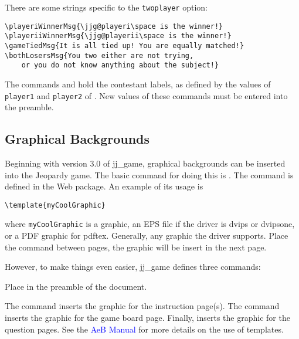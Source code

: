 \documentclass{article}
\def\jj{\textsf{jj\_game}}
\begin{document}
There are some strings specific to the \texttt{twoplayer} option:

\begin{Verbatim}[xleftmargin=\amtIndent,fontsize=\small]
\playeriWinnerMsg{\jjg@playeri\space is the winner!}
\playeriiWinnerMsg{\jjg@playerii\space is the winner!}
\gameTiedMsg{It is all tied up! You are equally matched!}
\bothLosersMsg{You two either are not trying,
    or you do not know anything about the subject!}
\end{Verbatim}
The commands  and  hold the contestant labels,
as defined by the values of \texttt{player1} and \texttt{player2} of .
New values of these commands must be entered into the preamble.


\subsection{Graphical Backgrounds}\label{graphicsBGs}

Beginning with version 3.0 of \jj, graphical backgrounds can be inserted into
the Jeopardy game. The basic command for doing this is .
The  command is defined in the Web package.  An example
of its usage is
\begin{Verbatim}
\template{myCoolGraphic}
\end{Verbatim}
where \texttt{myCoolGraphic} is a graphic, an EPS file if the driver
is dvips or dvipsone, or a PDF graphic for pdftex. Generally, any
graphic the driver supports.  Place the  command
between pages, the graphic will be insert in the next page.

However, to make things even easier, {\jj} defines three commands:
\bVerb{}%
\begin{dCmd}[commandchars=!()]{\bxSize}
\end{dCmd}
\endgroup
\CmdLoc Place in the preamble of the document.

\CmdDescription The  command inserts the
graphic for the instruction page(s). The  command
inserts the graphic for the game board page.
Finally,  inserts the graphic for the question
pages. See the \textcolor{blue}{AeB Manual} for more details on the use of templates.
\end{document}

